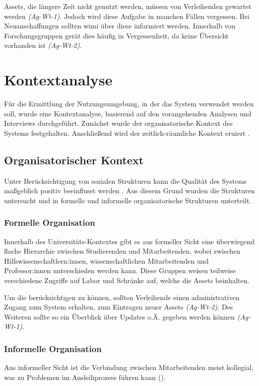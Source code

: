 Assets, die längere Zeit nicht genutzt werden, müssen von Verleihenden gewartet
werden \textit{(Ag-Wt-1)}. Jedoch wird diese Aufgabe in manchen Fällen
vergessen. Bei Neuanschaffungen sollten \ac{wimi} über diese informiert werden.
Innerhalb von Forschungsgruppen gerät dies häufig in Vergessenheit, da keine
Übersicht vorhanden ist \textit{(Ag-Wt-2)}.



\section{Kontextanalyse}
\label{section:kontext}

Für die Ermittlung der Nutzungsumgebung, in der das System verwendet werden
soll, wurde eine Kontextanalyse, basierend auf den vorangehenden Analysen und Interviews durchgeführt. Zunächst wurde der organisatorische Kontext des
Systems festgehalten. Anschließend wird der zeitlich-räumliche Kontext eruiert
\cite{herczeg_software-ergonomie_2018}.

\subsection{Organisatorischer Kontext}
Unter Berücksichtigung von sozialen Strukturen kann die Qualität des
Systems maßgeblich positiv beeinflusst werden \cite{herczeg_software-ergonomie_2018}. Aus
diesem Grund wurden die Strukturen untersucht und in formelle und informelle
organisatorische Strukturen unterteilt.

\subsubsection{Formelle Organisation}
Innerhalb des Universitäts-Kontextes gibt es aus formeller Sicht eine
überwiegend flache Hierarchie zwischen Studierenden und Mitarbeitenden, wobei
zwischen Hilfswissenschaftlern:innen, wissenschaftlichen Mitarbeitenden und
Professor:innen unterschieden werden kann. Diese Gruppen weisen teilweise
verschiedene Zugriffe auf Labor und Schränke auf, welche die Assets beinhalten.

Um die  berücksichtigen zu können, sollten Verleihende
einen administrativen Zugang zum System erhalten, zum Eintragen neuer Assets
\textit{(Ag-Wt-2)}. Des Weiteren sollte so ein Überblick über Updates o.Ä.
gegeben werden können \textit{(Ag-Wt-1)}.

\subsubsection{Informelle Organisation}
Aus informeller Sicht ist die Verbindung zwischen Mitarbeitenden meist
kollegial, was zu Problemen im Ausleihprozess führen kann
().

